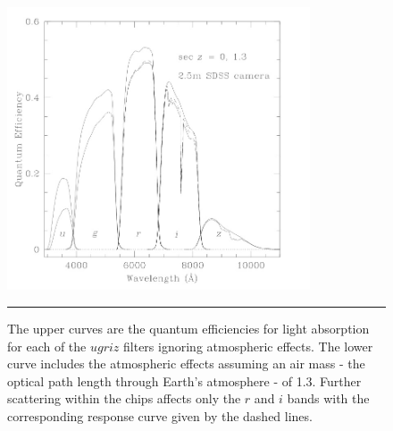 \begin{figure}[htbp]
	\centering
		\includegraphics[width = 0.8\textwidth]{./Figures/SDSS_EDR_band_effieciency.jpg}
		\rule{35em}{0.5pt}
	\caption[Response Curve]{The upper curves are the quantum efficiencies for light absorption for each of the $ugriz$ filters ignoring atmospheric effects. The lower curve includes the atmospheric effects assuming an air mass - the optical path length through Earth's atmosphere - of 1.3. Further scattering within the chips affects only the $r$ and $i$ bands with the corresponding response curve given by the dashed lines.}
	\label{fig:band_efficiencies}
\end{figure}

